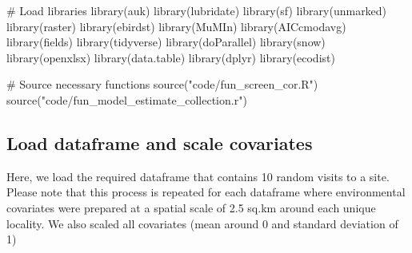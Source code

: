 \documentclass[]{article}
\newenvironment{Shaded}{}{}
\newcommand{\CommentTok}[1]{\textcolor[rgb]{0.00,0.50,0.00}{#1}}
\newcommand{\KeywordTok}[1]{\textcolor[rgb]{0.00,0.00,1.00}{#1}}
\newcommand{\NormalTok}[1]{#1}
\newcommand{\StringTok}[1]{\textcolor[rgb]{0.00,0.50,0.50}{#1}}
\begin{document}
\begin{Shaded}
\begin{Highlighting}[]
\CommentTok{# Load libraries}
\KeywordTok{library}\NormalTok{(auk)}
\KeywordTok{library}\NormalTok{(lubridate)}
\KeywordTok{library}\NormalTok{(sf)}
\KeywordTok{library}\NormalTok{(unmarked)}
\KeywordTok{library}\NormalTok{(raster)}
\KeywordTok{library}\NormalTok{(ebirdst)}
\KeywordTok{library}\NormalTok{(MuMIn)}
\KeywordTok{library}\NormalTok{(AICcmodavg)}
\KeywordTok{library}\NormalTok{(fields)}
\KeywordTok{library}\NormalTok{(tidyverse)}
\KeywordTok{library}\NormalTok{(doParallel)}
\KeywordTok{library}\NormalTok{(snow)}
\KeywordTok{library}\NormalTok{(openxlsx)}
\KeywordTok{library}\NormalTok{(data.table)}
\KeywordTok{library}\NormalTok{(dplyr)}
\KeywordTok{library}\NormalTok{(ecodist)}

\CommentTok{# Source necessary functions}
\KeywordTok{source}\NormalTok{(}\StringTok{"code/fun_screen_cor.R"}\NormalTok{)}
\KeywordTok{source}\NormalTok{(}\StringTok{"code/fun_model_estimate_collection.r"}\NormalTok{)}
\end{Highlighting}
\end{Shaded}

\hypertarget{load-dataframe-and-scale-covariates}{%
\subsection{Load dataframe and scale covariates}\label{load-dataframe-and-scale-covariates}}

Here, we load the required dataframe that contains 10 random visits to a site. Please note that this process is repeated for each dataframe where environmental covariates were prepared at a spatial scale of 2.5 sq.km around each unique locality. We also scaled all covariates (mean around 0 and standard deviation of 1)
\end{document}
